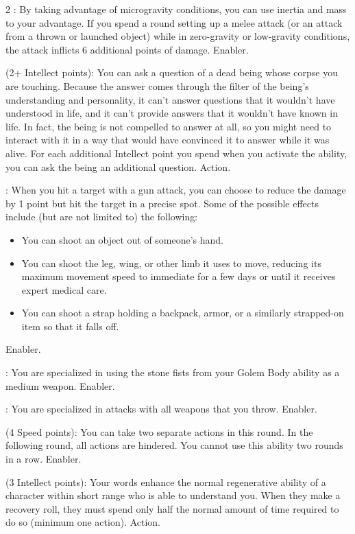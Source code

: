 \begin{multicols}{2}
: By taking advantage of microgravity conditions, you can use inertia and mass to your advantage. If you spend a round setting up a melee attack (or an attack from a thrown or launched object) while in zero-gravity or low-gravity conditions, the attack inflicts 6 additional points of damage. Enabler. 
 
 (2+ Intellect points): You can ask a question of a dead being whose corpse you are touching. Because the answer comes through the filter of the being’s understanding and personality, it can’t answer questions that it wouldn’t have understood in life, and it can’t provide answers that it wouldn’t have known in life. In fact, the being is not compelled to answer at all, so you might need to interact with it in a way that would have convinced it to answer while it was alive. For each additional Intellect point you spend when you activate the ability, you can ask the being an additional question. Action. 
 
: When you hit a target with a gun attack, you can choose to reduce the damage by 1 point but hit the target in a precise spot. Some of the possible effects include (but are not limited to) the following:
\begin{itemize}  
\item You can shoot an object out of someone’s hand. 
\item You can shoot the leg, wing, or other limb it uses to move, reducing its maximum movement speed to immediate for a few days or until it receives expert medical care. 
\item You can shoot a strap holding a backpack, armor, or a similarly strapped-on item so that it falls off. 
\end{itemize}
Enabler.
 
: You are specialized in using the stone fists from your Golem Body ability as a medium weapon. Enabler. 
 
: You are specialized in attacks with all weapons that you throw. Enabler.
 
 (4 Speed points): You can take two separate actions in this round. In the following round, all actions are hindered. You cannot use this ability two rounds in a row. Enabler.
 
 (3 Intellect points): Your words enhance the normal regenerative ability of a character within short range who is able to understand you. When they make a recovery roll, they must spend only half the normal amount of time required to do so (minimum one action). Action. 
 

\end{multicols}

